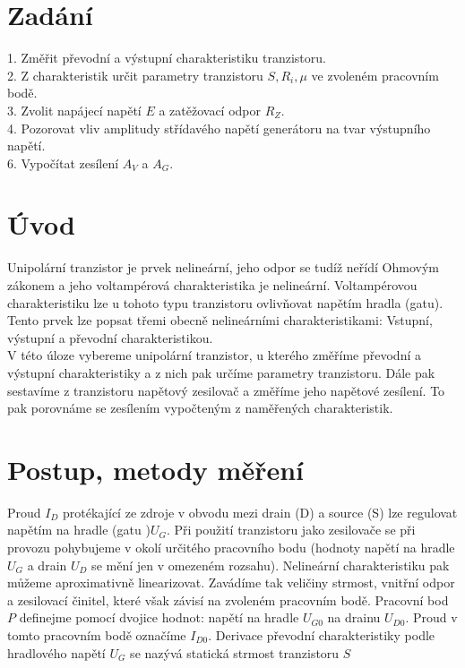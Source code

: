 \documentclass[czech,11pt,a4paper]{article}
\begin{document}
	\begin{multicols}{2}
	\section{Zadání}
	1. Změřit převodní a výstupní charakteristiku tranzistoru.\\
	2. Z charakteristik určit parametry tranzistoru $S, R_i, \mu $ ve zvoleném pracovním bodě.\\
	3. Zvolit napájecí napětí $E$ a zatěžovací odpor $R_Z$.\\
	4. Pozorovat vliv amplitudy střídavého napětí generátoru na tvar výstupního napětí.\\
	6. Vypočítat zesílení $A_V$ a $A_G$.\\
	\section{Úvod}
	Unipolární tranzistor je prvek nelineární, jeho odpor se tudíž neřídí Ohmovým zákonem a jeho voltampérová charakteristika je nelineární. Voltampérovou charakteristiku lze u tohoto typu tranzistoru ovlivňovat napětím hradla (gatu). Tento prvek lze popsat třemi obecně nelineárními charakteristikami: Vstupní, výstupní a převodní charakteristikou.\\V této úloze vybereme unipolární tranzistor, u kterého změříme převodní a výstupní charakteristiky a z nich pak určíme parametry tranzistoru. Dále pak sestavíme z tranzistoru napětový zesilovač a změříme jeho napětové zesílení. To pak porovnáme se zesílením vypočteným z naměřených charakteristik.
	\section{Postup, metody měření}
	Proud $I_D$ protékající ze zdroje v obvodu mezi drain (D) a source (S) lze regulovat napětím na hradle (gatu )$U_G$. 
	Při použití tranzistoru jako zesilovače se při provozu pohybujeme v okolí určitého pracovního bodu (hodnoty napětí na hradle $U_{G}$ a drain $U_{D}$ se mění jen v omezeném rozsahu). Nelineární charakteristiku pak můžeme aproximativně linearizovat. Zavádíme tak veličiny strmost, vnitřní odpor a zesilovací činitel, které však závisí na zvoleném pracovním bodě. Pracovní bod $P$ definejme pomocí dvojice hodnot: napětí na hradle $U_{G 0}$ na drainu $U_{D 0}$. Proud v tomto pracovním bodě označíme $I_{D 0}$.
	Derivace převodní charakteristiky podle hradlového napětí $U_{G}$ se nazývá statická strmost tranzistoru $S$
	

\end{multicols}
\end{document}

